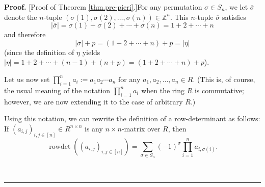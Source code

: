 \documentclass[numbers=enddot,12pt,final,onecolumn,notitlepage,english]{scrartcl}%
\theoremstyle{definition}
\newenvironment{proof}[1][Proof]{\noindent\textbf{#1.} }{\ \rule{0.5em}{0.5em}}
\let\sumnonlimits\sum
\let\prodnonlimits\prod
\renewcommand{\sum}{\sumnonlimits\limits}
\renewcommand{\prod}{\prodnonlimits\limits}
\newenvironment{vershort}{}{}
\begin{document}
\begin{vershort}
\begin{proof}
[Proof of Theorem \ref{thm.pre-pieri}.]For any permutation $\sigma\in S_{n}$,
we let $\overline{\sigma}$ denote the $n$-tuple $\left(  \sigma\left(
1\right)  ,\sigma\left(  2\right)  ,\ldots,\sigma\left(  n\right)  \right)
\in\mathbb{Z}^{n}$. This $n$-tuple $\overline{\sigma}$ satisfies
\[
\left\vert \overline{\sigma}\right\vert =\sigma\left(  1\right)
+\sigma\left(  2\right)  +\cdots+\sigma\left(  n\right)  =1+2+\cdots+n
\]
and therefore
\begin{equation}
\left\vert \overline{\sigma}\right\vert +p=\left(  1+2+\cdots+n\right)
+p=\left\vert \eta\right\vert \label{pf.thm.pre-pieri.short.modsigbar1}%
\end{equation}
(since the definition of $\eta$ yields \newline$\left\vert \eta\right\vert
=1+2+\cdots+\left(  n-1\right)  +\left(  n+p\right)  =\left(  1+2+\cdots
+n\right)  +p$).

Let us now set $\prod_{i=1}^{n}a_{i}:=a_{1}a_{2}\cdots a_{n}$ for any
$a_{1},a_{2},\ldots,a_{n}\in R$. (This is, of course, the usual meaning of the
notation $\prod_{i=1}^{n}a_{i}$ when the ring $R$ is commutative; however, we
are now extending it to the case of arbitrary $R$.)

Using this notation, we can rewrite the definition of a row-determinant as
follows: If $\left(  a_{i,j}\right)  _{i,j\in\left[  n\right]  }\in R^{n\times
n}$ is any $n\times n$-matrix over $R$, then%
\begin{equation}
\operatorname*{rowdet}\left(  \left(  a_{i,j}\right)  _{i,j\in\left[
n\right]  }\right)  =\sum_{\sigma\in S_{n}}\left(  -1\right)  ^{\sigma}%
\prod_{i=1}^{n}a_{i,\sigma\left(  i\right)  }.
\label{pf.thm.pre-pieri.short.rowdetA=}%
\end{equation}



\end{proof}
\end{vershort}
\end{document}
